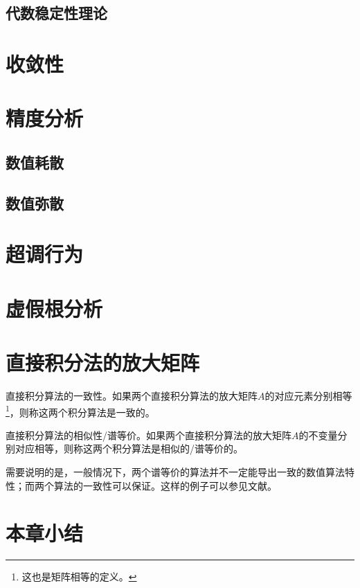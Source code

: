 \subsection{代数稳定性理论}










\section{收敛性}

\section{精度分析}

\subsection{数值耗散}

\subsection{数值弥散}

\section{超调行为}

\section{虚假根分析}

\section{直接积分法的放大矩阵}

\begin{definition}
直接积分算法的一致性\cite{Hoff1988}。如果两个直接积分算法的放大矩阵$A$的对应元素分别相等\footnote{这也是矩阵相等的定义。}，则称这两个积分算法是一致的。
\end{definition}

\begin{definition}
直接积分算法的相似性/谱等价\cite{Hoff1988}。如果两个直接积分算法的放大矩阵$A$的不变量分别对应相等，则称这两个积分算法是相似的/谱等价的。
\end{definition}

需要说明的是，一般情况下，两个谱等价的算法并不一定能导出一致的数值算法特性；而两个算法的一致性可以保证。这样的例子可以参见文献。

\section{本章小结}



